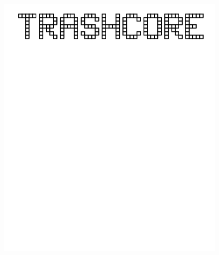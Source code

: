 \documentclass[17pt]{extreport}
\begin{document}
	\begin{figure}
		\centering
		\includegraphics[width=7.5in]{imageserver/uploadimages/trashcore.png}
	\end{figure}	
\end{document}
